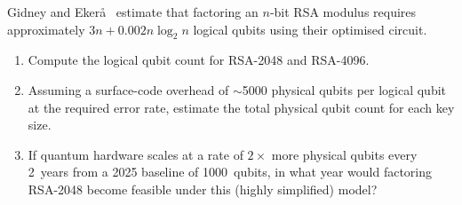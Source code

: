 \begin{prob}
\label{prob:ch01-shor-resources}
Gidney and Eker\r{a}~\cite{GidneyEkera2021} estimate that factoring an $n$-bit RSA modulus requires approximately $3n + 0.002n\log_2 n$ logical qubits using their optimised circuit.
\begin{enumerate}
\item[(a)] Compute the logical qubit count for RSA-2048 and RSA-4096.
\item[(b)] Assuming a surface-code overhead of $\sim$5000 physical qubits per logical qubit at the required error rate, estimate the total physical qubit count for each key size.
\item[(c)] If quantum hardware scales at a rate of $2\times$ more physical qubits every 2~years from a 2025 baseline of 1000~qubits, in what year would factoring RSA-2048 become feasible under this (highly simplified) model?
\end{enumerate}
\end{prob}
